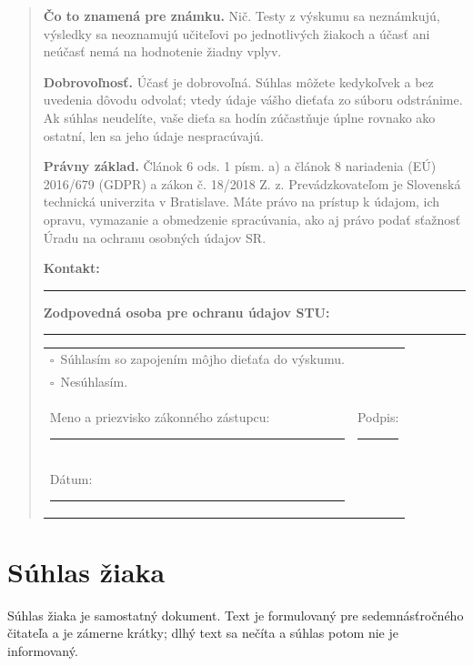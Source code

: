 \begin{quote}
\textbf{Čo to znamená pre známku.} Nič. Testy z výskumu sa neznámkujú, výsledky sa neoznamujú učiteľovi po jednotlivých žiakoch a účasť ani neúčasť nemá na hodnotenie žiadny vplyv.

\textbf{Dobrovoľnosť.} Účasť je dobrovoľná. Súhlas môžete kedykoľvek a bez uvedenia dôvodu odvolať; vtedy údaje vášho dieťaťa zo súboru odstránime. Ak súhlas neudelíte, vaše dieťa sa hodín zúčastňuje úplne rovnako ako ostatní, len sa jeho údaje nespracúvajú.

\textbf{Právny základ.} Článok 6 ods. 1 písm. a) a článok 8 nariadenia (EÚ) 2016/679 (GDPR) a zákon č. 18/2018 Z. z. Prevádzkovateľom je Slovenská technická univerzita v Bratislave. Máte právo na prístup k údajom, ich opravu, vymazanie a obmedzenie spracúvania, ako aj právo podať sťažnosť Úradu na ochranu osobných údajov SR.

\textbf{Kontakt:} \rule{6cm}{0.4pt} \quad \textbf{Zodpovedná osoba pre ochranu údajov STU:} \rule{4cm}{0.4pt}

\vspace{6pt}
\begin{tabular}{@{}p{7.0cm}p{5.4cm}@{}}
$\square$~Súhlasím so zapojením môjho dieťaťa do výskumu. & \\
$\square$~Nesúhlasím. & \\[10pt]
Meno a priezvisko zákonného zástupcu: \rule{4.5cm}{0.4pt} & Podpis: \rule{3.5cm}{0.4pt} \\[10pt]
Dátum: \rule{3cm}{0.4pt} & \\
\end{tabular}
\end{quote}

\section{Súhlas žiaka}

Súhlas žiaka je samostatný dokument. Text je formulovaný pre sedemnásťročného čitateľa a je zámerne krátky; dlhý text sa nečíta a súhlas potom nie je informovaný.

